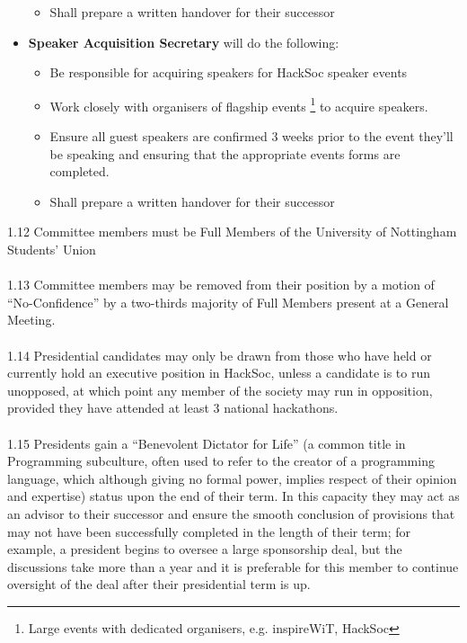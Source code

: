 \documentclass[a4paper,twoside,notitlepage,11pt]{article}
\begin{document}
\begin{itemize}
\begin{itemize}
	  \item Shall prepare a written handover for their successor
	\end{itemize}
	\item \textbf{Speaker Acquisition Secretary} will do the following:
	\begin{itemize}
		\item Be responsible for acquiring speakers for HackSoc speaker events
		\item Work closely with organisers of flagship events \footnote{Large events with dedicated organisers, e.g. inspireWiT, HackSoc} to acquire speakers.
		\item Ensure all guest speakers are confirmed 3 weeks prior to the event they'll be speaking and ensuring that the appropriate events forms are completed.
		\item Shall prepare a written handover for their successor
	\end{itemize}

\end{itemize}
1.12 Committee members must be Full Members of the University of Nottingham Students' Union\ \\
\ \\
1.13 Committee members may be removed from their position by a motion of ``No-Confidence'' by a two-thirds majority of Full Members present at a General Meeting.\ \\
\ \\
1.14 Presidential candidates may only be drawn from those who have held or currently hold an executive position in HackSoc, unless a candidate is to run unopposed, at which point any member of the society may run in opposition, provided they have attended at least 3 national hackathons.\ \\
\ \\
1.15 Presidents gain a ``Benevolent Dictator for Life'' (a common title in Programming subculture, often used to refer to the creator of a programming language, which although giving no formal power, implies respect of their opinion and expertise) status upon the end of their term. In this capacity they may act as an advisor to their successor and ensure the smooth conclusion of provisions that may not have been successfully completed in the length of their term; for example, a president begins to oversee a large sponsorship deal, but the discussions take more than a year and it is preferable for this member to continue oversight of the deal after their presidential term is up.\ \\
\end{document}
